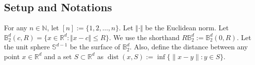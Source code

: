 \documentclass[aoap]{imsart}
\numberwithin{equation}{section}
\theoremstyle{definition}
\theoremstyle{remark}
\numberwithin{equation}{section}
\renewcommand{\S}{\mathbb{S}}
\newcommand{\0}{\mathbf{0}}
\newcommand{\1}{\mathbf{1}}
\newcommand{\B}{\mathbb{B}}
\renewcommand{\S}{\mathbb{S}}
\let \Re \relax
\DeclareMathOperator{\Re}{ReLU}
\DeclareMathOperator{\dist}{dist}
\numberwithin{equation}{section}
\begin{document}



 
\subsection{Setup and Notations}
For any $n\in \mathbb{N}$, let $[n]:=\lbrace 1, 2, \dots , n\rbrace$. Let $\Vert\cdot\Vert$ be the Euclidean norm.  Let $\B_{2}^d(c,R) = \{x\in \mathbb{R}^d:\Vert x-c\Vert \le R\}$. We use the shorthand $R\B_{2}^{d}:=\B_{2}^d(0,R)$. Let the unit sphere $\S^{d-1}$ be the surface of $\B_{2}^{d}$. Also, define the distance between any point $x\in \mathbb{R}^d$ and a set $S\subset \mathbb{R}^d$ as $\dist(x,S) :=\inf \lbrace \|x-y\|:y\in S\rbrace$.
\end{document}
